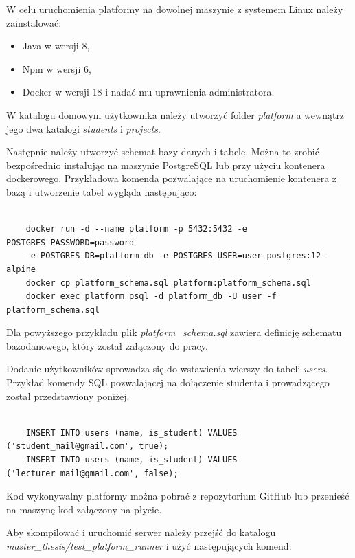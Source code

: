 W celu uruchomienia platformy na dowolnej maszynie z systemem Linux należy zainstalować:
\begin{itemize}
    \item Java w wersji 8,
    \item Npm w wersji 6,
    \item Docker w wersji 18 i nadać mu uprawnienia administratora.
\end{itemize}

W katalogu domowym użytkownika należy utworzyć folder \textit{platform} a wewnątrz jego dwa katalogi \textit{students} i \textit{projects}.

Następnie należy utworzyć schemat bazy danych i tabele.
Można to zrobić bezpośrednio instalując na maszynie PostgreSQL lub przy użyciu kontenera dockerowego.
Przykładowa komenda pozwalające na uruchomienie kontenera z bazą i utworzenie tabel wygląda następująco:

{\selectfont
\tiny
\begin{lstlisting}

    docker run -d --name platform -p 5432:5432 -e POSTGRES_PASSWORD=password
    -e POSTGRES_DB=platform_db -e POSTGRES_USER=user postgres:12-alpine
    docker cp platform_schema.sql platform:platform_schema.sql
    docker exec platform psql -d platform_db -U user -f platform_schema.sql

\end{lstlisting}
}

Dla powyższego przykładu plik \textit{platform\_schema.sql} zawiera definicję schematu bazodanowego, który został załączony do pracy.

Dodanie użytkowników sprowadza się do wstawienia wierszy do tabeli \textit{users}.
Przykład komendy SQL pozwalającej na dołączenie studenta i prowadzącego został przedstawiony poniżej.

{\selectfont
\tiny
\begin{lstlisting}

    INSERT INTO users (name, is_student) VALUES ('student_mail@gmail.com', true);
    INSERT INTO users (name, is_student) VALUES ('lecturer_mail@gmail.com', false);

\end{lstlisting}
}

Kod wykonywalny platformy można pobrać z repozytorium GitHub lub przenieść na maszynę kod załączony na płycie.

Aby skompilować i uruchomić serwer należy przejść do katalogu \newline \textit{master\_thesis/test\_platform\_runner} i użyć następujących komend:

